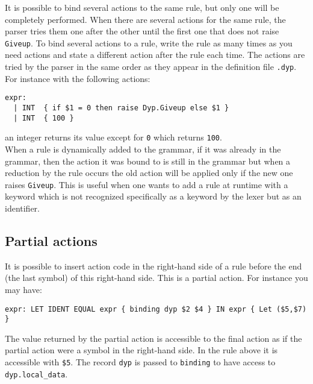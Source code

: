 \documentclass[12pt]{article}
\begin{document}
{It is possible to bind several actions to the same rule, but only one will be completely performed. When there are several actions for the same rule, the parser tries them one after the other until the first one that does not raise \texttt{Giveup}. To bind several actions to a rule, write the rule as many times as you need actions and state a different action after the rule each time. The actions are tried by the parser in the same order as they appear in the definition file \texttt{.dyp}. For instance with the following actions:
\begin{verbatim}
expr:
  | INT  { if $1 = 0 then raise Dyp.Giveup else $1 }
  | INT  { 100 }
\end{verbatim}
an integer returns its value except for \texttt{0} which returns \texttt{100}.\\

When a rule is dynamically added to the grammar, if it was already in the grammar, then the action it was bound to is still in the grammar but when a reduction by the rule occurs the old action will be applied only if the new one raises \texttt{Giveup}. This is useful when one wants to add a rule at runtime with a keyword which is not recognized specifically as a keyword by the lexer but as an identifier.

\subsection{Partial actions}

It is possible to insert action code in the right-hand side of a rule before the end (the last symbol) of this right-hand side. This is a partial action. For instance you may have:
\begin{verbatim}
expr: LET IDENT EQUAL expr { binding dyp $2 $4 } IN expr { Let ($5,$7) }
\end{verbatim}
The value returned by the partial action is accessible to the final action as if the partial action were a symbol in the right-hand side. In the rule above it is accessible with \texttt{\$5}. The record \verb|dyp| is passed to \verb|binding| to have access to \verb|dyp.local_data|.\\

}
\end{document}
